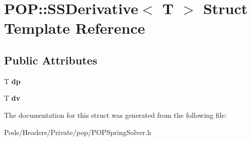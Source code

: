 \hypertarget{struct_p_o_p_1_1_s_s_derivative}{}\section{P\+OP\+:\+:S\+S\+Derivative$<$ T $>$ Struct Template Reference}
\label{struct_p_o_p_1_1_s_s_derivative}
\subsection*{Public Attributes}
\begin{DoxyCompactItemize}
\item 
\mbox{\label{struct_p_o_p_1_1_s_s_derivative_a89e79a7839cbe5417bcb85c871a3161e}} 
T {\bfseries dp}
\item 
\mbox{\label{struct_p_o_p_1_1_s_s_derivative_a9f5ca9b76ed70087119453014c87d03b}} 
T {\bfseries dv}
\end{DoxyCompactItemize}


The documentation for this struct was generated from the following file\+:\begin{DoxyCompactItemize}
\item 
Pods/\+Headers/\+Private/pop/P\+O\+P\+Spring\+Solver.\+h\end{DoxyCompactItemize}
